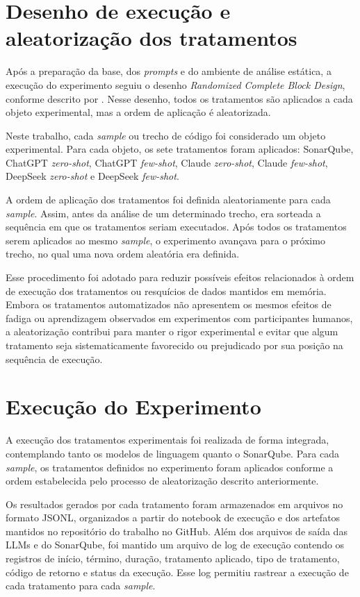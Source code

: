 \section{Desenho de execução e aleatorização dos tratamentos}

Após a preparação da base, dos \textit{prompts} e do ambiente de análise estática, a execução do experimento seguiu o desenho \textit{Randomized Complete Block Design}, 
conforme descrito por . Nesse desenho, todos os tratamentos são aplicados a cada objeto experimental, mas a ordem de aplicação é aleatorizada.

Neste trabalho, cada \textit{sample} ou trecho de código foi considerado um objeto experimental. Para cada objeto, os sete tratamentos foram aplicados: 
SonarQube, ChatGPT \textit{zero-shot}, ChatGPT \textit{few-shot}, Claude \textit{zero-shot}, Claude \textit{few-shot}, DeepSeek \textit{zero-shot} e DeepSeek \textit{few-shot}.

A ordem de aplicação dos tratamentos foi definida aleatoriamente para cada \textit{sample}. Assim, antes da análise de um determinado trecho, 
era sorteada a sequência em que os tratamentos seriam executados. Após todos os tratamentos serem aplicados ao mesmo \textit{sample}, 
o experimento avançava para o próximo trecho, no qual uma nova ordem aleatória era definida.

Esse procedimento foi adotado para reduzir possíveis efeitos relacionados à ordem de execução dos tratamentos ou resquícios de dados mantidos em memória. 
Embora os tratamentos automatizados não apresentem os mesmos efeitos de fadiga ou aprendizagem observados em 
experimentos com participantes humanos, a aleatorização contribui para manter o rigor experimental e evitar que algum 
tratamento seja sistematicamente favorecido ou prejudicado por sua posição na sequência de execução.

\section{Execução do Experimento}
\label{sec:execucao-experimento}

A execução dos tratamentos experimentais foi realizada de forma integrada, contemplando tanto os modelos de linguagem quanto o SonarQube. 
Para cada \textit{sample}, os tratamentos definidos no experimento foram aplicados conforme a ordem estabelecida pelo processo de aleatorização descrito anteriormente.

Os resultados gerados por cada tratamento foram armazenados em arquivos no formato JSONL, organizados a partir do notebook de execução e dos artefatos mantidos no repositório do trabalho no GitHub. Além dos arquivos de saída das LLMs e do SonarQube, 
foi mantido um arquivo de log de execução contendo os registros de início, término, duração, tratamento aplicado, tipo de tratamento, 
código de retorno e status da execução. Esse log permitiu rastrear a execução de cada tratamento para cada \textit{sample}.

